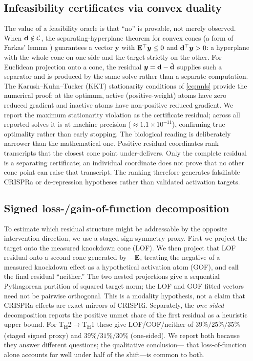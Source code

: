 \subsection{Infeasibility certificates via convex duality}
\label{sec:methods-cert}
The value of a feasibility oracle is that ``no'' is provable, not merely observed. When
$\mathbf{d}\notin\mathcal{C}$, the separating-hyperplane theorem for convex cones (a form of Farkas'
lemma \citep{Farkas1902}) guarantees a vector $\bm{y}$ with $\mathbf{E}^{\top}\bm{y}\le 0$ and
$\mathbf{d}^{\top}\bm{y}>0$: a hyperplane with the whole cone on one side and the target strictly
on the other. For Euclidean projection onto a cone, the residual
$\bm{y}=\mathbf{d}-\hat{\mathbf{d}}$ supplies such a separator and is produced by the same solve rather
than a separate computation. The
Karush--Kuhn--Tucker (KKT) stationarity conditions of \eqref{eq:nnls} provide the numerical
proof: at the optimum, active (positive-weight) atoms have zero reduced gradient and inactive
atoms have non-positive reduced gradient. We report the maximum stationarity violation as the
certificate residual; across all reported solves it is at machine precision
($\approx\!1.1\times10^{-11}$), confirming true optimality rather than early stopping. The
biological reading is deliberately narrower than the mathematical one. Positive residual
coordinates rank transcripts that the closest cone point under-delivers. Only the complete
residual is a separating certificate; an individual coordinate does not prove that no other
cone point can raise that transcript. The ranking therefore generates falsifiable CRISPRa or
de-repression hypotheses rather than validated activation targets.

\subsection{Signed loss-/gain-of-function decomposition}
\label{sec:methods-decomp}
To estimate which residual structure might be addressable by the opposite intervention
direction, we use a staged sign-symmetry proxy. First we project the target onto the measured
knockdown cone (LOF). We then project that LOF residual onto a second cone generated by
$-\mathbf{E}$, treating the negative of a measured knockdown effect as a hypothetical activation
atom (GOF), and call the final residual ``neither.'' The two nested projections give a
sequential Pythagorean partition of squared target norm; the LOF and GOF fitted vectors need
not be pairwise orthogonal. This is a modality hypothesis, not a claim that CRISPRa effects are
exact mirrors of CRISPRi. Separately, the \emph{one-sided} decomposition reports the positive
unmet share of the first residual as a heuristic upper bound. For
T\textsubscript{H}2$\rightarrow$T\textsubscript{H}1 these give LOF/GOF/neither of
$39\%/25\%/35\%$ (staged signed proxy) and $39\%/31\%/30\%$ (one-sided). We report both
because they answer different questions; the qualitative conclusion---%
that loss-of-function alone accounts for well under half of the shift---is common to both.

